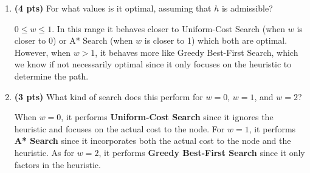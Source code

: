 \documentclass{article}
\begin{document}
\begin{enumerate}
\begin{enumerate}[label=($\alph*$)]


    \item \textbf{(4 pts)} For what values is it optimal, assuming that $h$ is admissible?

    \color{blue}
        $0 \leq w \leq 1$. In this range it behaves closer to Uniform-Cost Search (when $w$ is closer to 0) or A* Search (when $w$ is closer to 1) which both are optimal. However, when $w > 1$, it behaves more like Greedy Best-First Search, which we know if not necessarily optimal since it only focuses on the heuristic to determine the path.
    \color{black}



    \item \textbf{(3 pts)} What kind of search does this perform for $w=0$, $w=1$, and $w=2$?

    \color{blue}
        When $w = 0$, it performs \textbf{Uniform-Cost Search} since it ignores the heuristic and focuses on the actual cost to the node. For $w = 1$, it performs \textbf{A* Search} since it incorporates both the actual cost to the node and the heuristic. As for $w = 2$, it performs \textbf{Greedy Best-First Search} since it only factors in the heuristic.
    \color{black}

    
    \end{enumerate}


\end{enumerate}
\end{document}

